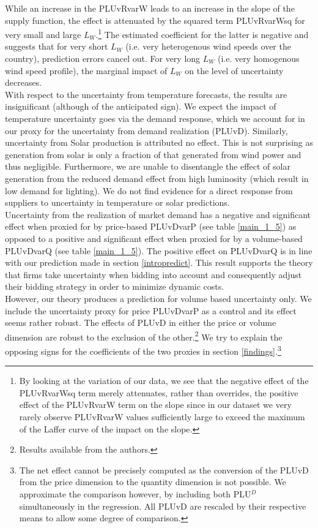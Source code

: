 While an increase in the PLUvRvarW leads to an increase in the slope of the supply function, the effect is attenuated by the squared term PLUvRvarWsq for very small and large $L_W$.\footnote{By looking at the variation of our data, we see that the negative effect of the PLUvRvarWsq term merely attenuates, rather than overrides, the positive effect of the PLUvRvarW term on the slope since in our dataset we very rarely observe PLUvRvarW values sufficiently large to exceed the maximum of the Laffer curve of the impact on the slope.} The estimated coefficient for the latter is negative and suggests that for very short $L_W$ (i.e. very heterogenous wind speeds over the country), prediction errors cancel out. For very long $L_W$ (i.e. very homogenous wind speed profile), the marginal impact of $L_W$ on the level of uncertainty decreases. \\

With respect to the uncertainty from temperature forecasts, the results are insignificant (although of the anticipated sign). We expect the impact of temperature uncertainty goes via the demand response, which we account for in our proxy for the uncertainty from demand realization (PLUvD). Similarly, uncertainty from Solar production is attributed no effect. This is not surprising as generation from solar is only a fraction of that generated from wind power and thus negligible. Furthermore, we are unable to disentangle the effect of solar generation from the reduced demand effect from high luminosity (which result in low demand for lighting). We do not find evidence for a direct response from suppliers to uncertainty in temperature or solar predictions. \\

Uncertainty from the realization of market demand has a negative and significant effect when proxied for by price-based PLUvDvarP (see table \ref{main_1_5}) as opposed to a positive and significant effect when proxied for by a volume-based PLUvDvarQ (see table \ref{main_1_5}). 
The positive effect on PLUvDvarQ is in line with our prediction made in section \ref{intropredict}. This result supports the theory that firms take uncertainty when bidding into account and consequently adjust their bidding strategy in order to minimize dynamic costs. \\

However, our theory produces a prediction for volume based uncertainty only. We include the uncertainty proxy for price PLUvDvarP as a control and its effect seems rather robust. The effects of PLUvD in either the price or volume dimension are robust to the exclusion of the other.\footnote{Results available from the authors.} We try to explain the opposing signs for the coefficients of the two proxies in section \ref{findings}.\footnote{The net effect cannot be precisely computed as the conversion of the PLUvD from the price dimension to the quantity dimension is not possible. We approximate the comparison however, by including both PLU$^{D}$ simultaneously in the regression. All PLUvD are rescaled by their respective means to allow some degree of comparison.} \\

